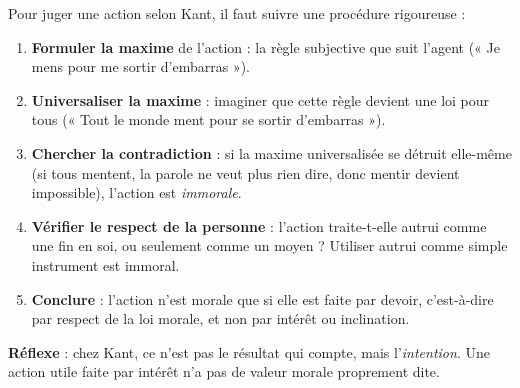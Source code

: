 \documentclass[11pt]{article}
\newcommand{\cle}[1]{{\popxbold\color{popdark}#1}}
\begin{document}
\begin{methode}
Pour juger une action selon Kant, il faut suivre une procédure rigoureuse :
\begin{enumerate}
\item \textbf{Formuler la maxime} de l'action : la règle subjective que suit l'agent (« Je mens pour me sortir d'embarras »).
\item \textbf{Universaliser la maxime} : imaginer que cette règle devient une loi pour tous (« Tout le monde ment pour se sortir d'embarras »).
\item \textbf{Chercher la contradiction} : si la maxime universalisée se détruit elle-même (si tous mentent, la parole ne veut plus rien dire, donc mentir devient impossible), l'action est \emph{immorale}.
\item \textbf{Vérifier le respect de la personne} : l'action traite-t-elle autrui comme une \cle{fin} en soi, ou seulement comme un moyen ? Utiliser autrui comme simple instrument est immoral.
\item \textbf{Conclure} : l'action n'est morale que si elle est faite par \cle{devoir}, c'est-à-dire par respect de la loi morale, et non par intérêt ou inclination.
\end{enumerate}
\textbf{Réflexe} : chez Kant, ce n'est pas le résultat qui compte, mais l'\emph{intention}. Une action utile faite par intérêt n'a pas de valeur morale proprement dite.
\end{methode}
\end{document}
